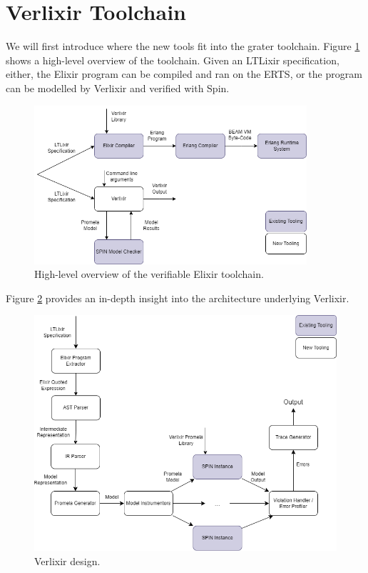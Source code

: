 \section{Verlixir Toolchain} \label{sec:toolchain}
We will first introduce where the new tools fit into the grater toolchain. Figure \ref{fig:high_level} shows a high-level overview of the toolchain. Given an LTLixir specification, either, the Elixir program can be compiled and ran on the ERTS, or the program can be modelled by Verlixir and verified with Spin.
\begin{figure}[H]
    \centering
    \includegraphics[width=0.9\textwidth]{images/high_level_system_v2.drawio.png}
    \caption{High-level overview of the verifiable Elixir toolchain.}
    \label{fig:high_level}
\end{figure}
Figure \ref{fig:low_level} provides an in-depth insight into the architecture underlying Verlixir.
\begin{figure}[H]
    \centering
    \includegraphics[width=1\textwidth]{images/detailed_diagram_v2.drawio.png}
    \caption{Verlixir design.}
    \label{fig:low_level}
\end{figure}
